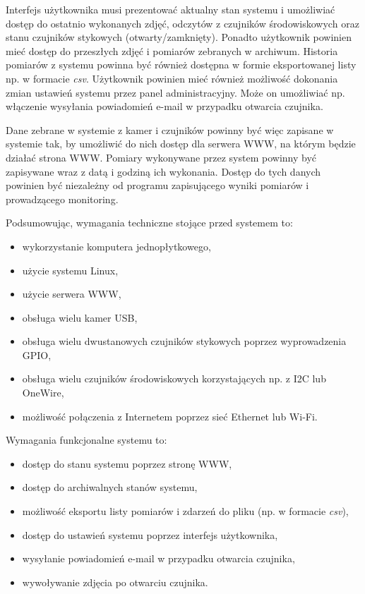 \documentclass[a4paper,11pt,twoside]{article}
\begin{document}
Interfejs użytkownika musi prezentować aktualny stan systemu i umożliwiać dostęp do ostatnio wykonanych zdjęć, odczytów z czujników środowiskowych oraz stanu czujników stykowych (otwarty/zamknięty). Ponadto użytkownik powinien mieć dostęp do przeszłych zdjęć i pomiarów zebranych w archiwum. Historia pomiarów z systemu powinna być również dostępna w formie eksportowanej listy np. w formacie \textit{csv}. Użytkownik powinien mieć również możliwość dokonania zmian ustawień systemu przez panel administracyjny. Może on umożliwiać np. włączenie wysyłania powiadomień e-mail w przypadku otwarcia czujnika.

Dane zebrane w systemie z kamer i czujników powinny być więc zapisane w systemie tak, by umożliwić do nich dostęp dla serwera WWW, na którym będzie działać strona WWW. Pomiary wykonywane przez system powinny być zapisywane wraz z datą i godziną ich wykonania. Dostęp do tych danych powinien być niezależny od programu zapisującego wyniki pomiarów i prowadzącego monitoring.

Podsumowując, wymagania techniczne stojące przed systemem to:
\begin{itemize}
\item wykorzystanie komputera jednopłytkowego,
\item użycie systemu Linux,
\item użycie serwera WWW,
\item obsługa wielu kamer USB,
\item obsługa wielu dwustanowych czujników stykowych poprzez wyprowadzenia GPIO,
\item obsługa wielu czujników środowiskowych korzystających np. z I2C lub OneWire,
\item możliwość połączenia z Internetem poprzez sieć Ethernet lub Wi-Fi.
\end{itemize}

Wymagania funkcjonalne systemu to:
\begin{itemize}
\item dostęp do stanu systemu poprzez stronę WWW,
\item dostęp do archiwalnych stanów systemu,
\item możliwość eksportu listy pomiarów i zdarzeń do pliku (np. w formacie \textit{csv}),
\item dostęp do ustawień systemu poprzez interfejs użytkownika,
\item wysyłanie powiadomień e-mail w przypadku otwarcia czujnika,
\item wywoływanie zdjęcia po otwarciu czujnika.
\end{itemize}
\end{document}
